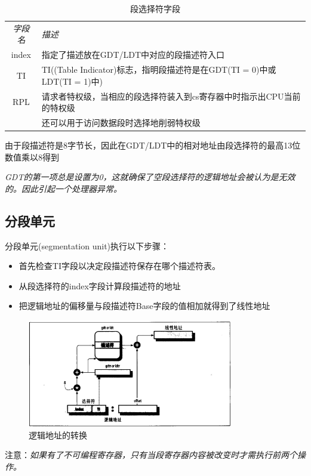 \begin{table}[!htbp]
    \begin{center}
        \caption{段选择符字段}
        \begin{tabular}{c l}
            \hline
            \emph{字段名} & \emph{描述} \\
            index & 指定了描述放在GDT/LDT中对应的段描述符入口 \\
            TI & TI((Table Indicator)标志，指明段描述符是在GDT(TI = 0)中或LDT(TI = 1)中) \\
            RPL & 请求者特权级，当相应的段选择符装入到cs寄存器中时指示出CPU当前的特权级 \\
            & 还可以用于访问数据段时选择地削弱特权级 \\
            \hline
        \end{tabular}
    \end{center}
\end{table}

    由于段描述符是8字节长，因此在GDT/LDT中的相对地址由段选择符的最高13位数值乘以8得到

    \emph{GDT的第一项总是设置为0，这就确保了空段选择符的逻辑地址会被认为是无效的。因此引起一个处理器异常。}

\subsection{分段单元}

    分段单元(segmentation unit)执行以下步骤：

\begin{itemize}
    \item 首先检查TI字段以决定段描述符保存在哪个描述符表。
    \item 从段选择符的index字段计算段描述符的地址
    \item 把逻辑地址的偏移量与段描述符Base字段的值相加就得到了线性地址
\end{itemize}

\begin{figure}[!htbp]
    \centering
    \includegraphics[width=0.8\textwidth]{image/chapter02/逻辑地址的转换.png}
    \caption{逻辑地址的转换}
\end{figure}

    注意：\emph{如果有了不可编程寄存器，只有当段寄存器内容被改变时才需执行前两个操作。}